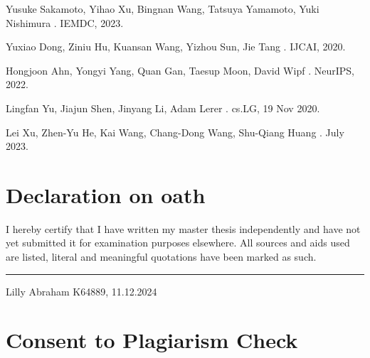 \documentclass{report} %
\begin{document}
\begin{thebibliography}{00}
    \newblock Yusuke Sakamoto, Yihao Xu, Bingnan Wang, Tatsuya Yamamoto, Yuki Nishimura
    .
    \newblock IEMDC, 2023.

    \newblock Yuxiao Dong, Ziniu Hu, Kuansan Wang, Yizhou Sun, Jie Tang
    .
    \newblock IJCAI, 2020.

    \newblock Hongjoon Ahn, Yongyi Yang, Quan Gan, Taesup Moon, David Wipf
    .
    \newblock NeurIPS, 2022.

    \newblock Lingfan Yu, Jiajun Shen, Jinyang Li, Adam Lerer
    .
    \newblock cs.LG, 19 Nov 2020.

    \newblock Lei Xu, Zhen-Yu He, Kai Wang, Chang-Dong Wang, Shu-Qiang Huang
    .
     July 2023.

\end{thebibliography}


\chapter*{Declaration on oath}

\vspace{1cm}

\noindent I hereby certify that I have written my master thesis independently and have not yet submitted it for examination purposes elsewhere. All sources and aids used are listed, literal and meaningful quotations have been marked as such.

\vspace{3cm}
\hfill\rule{15cm}{0.4pt} %

\begin{center}
    Lilly Abraham K64889, 11.12.2024 %
\end{center}

\newpage 

\chapter*{Consent to Plagiarism Check}
\vspace{1cm}
\end{document}
